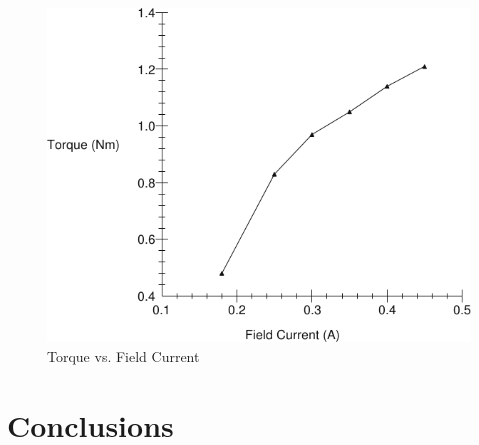 \documentclass{article}
\begin{document}
\begin{figure}[H]
  \centering
  \includegraphics[width=\textwidth]{img/plot5}
  \caption{Torque vs. Field Current}
  \label{fig:plot5}
\end{figure}

\section{Conclusions}

\end{document}
